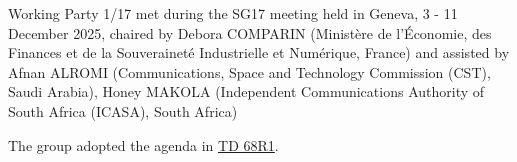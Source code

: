 Working Party 1/17 met during the SG17 meeting held in Geneva, 3 - 11 December 2025, chaired by Debora COMPARIN (Ministère de l'Économie, des Finances et de la Souveraineté Industrielle et Numérique, France) and assisted by Afnan ALROMI (Communications, Space and Technology Commission (CST), Saudi Arabia), Honey MAKOLA (Independent Communications Authority of South Africa (ICASA), South Africa)

The group adopted the agenda in \href{https://www.itu.int/md/meetingdoc.asp?lang=en\&parent=T25-SG17-251203-TD-WP1-0068}{TD 68R1}.
